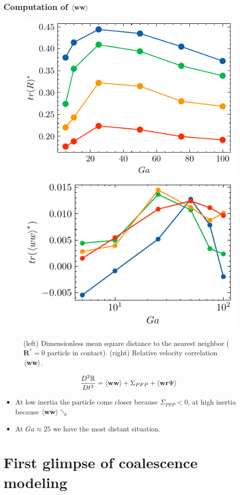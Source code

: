 \documentclass{sintefbeamer}
\begin{document}
\begin{frame}
  \frametitle{Computation of $\left<\textbf{ww}\right>$}
  \begin{figure}
    \includegraphics[height=0.23\textwidth]{image/HOMOGENEOUS/fPA/RR.pdf}
    \includegraphics[height=0.23\textwidth]{image/HOMOGENEOUS/fPA/trWW.pdf}
    \caption{ 
      (left) Dimensionless  mean square distance to the nearest neighbor ($\textbf{R}^* =0$ particle in contact). 
      (right) Relative velocity correlation  $\left<\textbf{ww}\right>$.
      }
  \end{figure}
  \begin{equation*}
    \frac{D^2 \mathbb{R}}{Dt^2}
  = \left<\textbf{w}\textbf{w}\right>
  + \Sigma_{PFP}
  + \left<\textbf{w}\textbf{r}\Psi\right>
\end{equation*}
  
  
\begin{itemize}
  \item At low inertia the particle come closer because $\Sigma_{PFP}<0$, at high inertia because $\left<\textbf{ww}\right> \searrow$
  \item At $Ga \approx 25$ we have the most distant situation. 
\end{itemize}

\end{frame}




\section{First glimpse of coalescence modeling}
\section*{}
\end{document}
